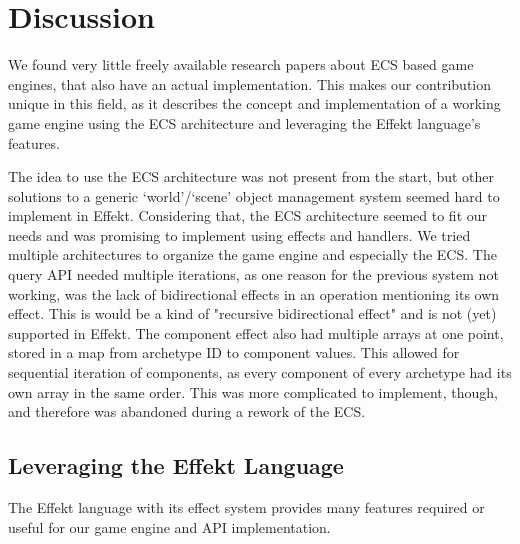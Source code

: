 \chapter{Discussion}\label{chap:discussion}

We found very little freely available research papers about ECS based game engines, that also have an actual implementation. This makes our contribution unique in this field, as it describes the concept and implementation of a working game engine using the ECS architecture and leveraging the Effekt language's features.

The idea to use the ECS architecture was not present from the start, but other solutions to a generic `world'/`scene' object management system seemed hard to implement in Effekt. Considering that, the ECS architecture seemed to fit our needs and was promising to implement using effects and handlers. We tried multiple architectures to organize the game engine and especially the ECS. The query API needed multiple iterations, as one reason for the previous system not working, was the lack of bidirectional effects in an operation mentioning its own effect. This is would be a kind of "recursive bidirectional effect" and is not (yet) supported in Effekt. The component effect also had multiple arrays at one point, stored in a map from archetype ID to component values. This allowed for sequential iteration of components, as every component of every archetype had its own array in the same order. This was more complicated to implement, though, and therefore was abandoned during a rework of the ECS.

\section{Leveraging the Effekt Language}

The Effekt language with its effect system provides many features required or useful for our game engine and API implementation.

